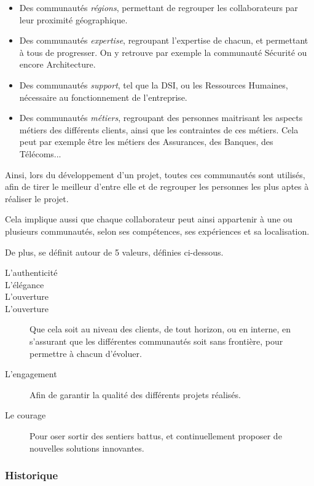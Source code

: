 \begin{itemize}
	\item Des communautés \emph{régions}, permettant de regrouper les collaborateurs par leur proximité géographique.
	\item Des communautés \emph{expertise}, regroupant l'expertise de chacun, et permettant à tous de progresser. On y retrouve par exemple la communauté Sécurité ou encore Architecture.
	\item Des communautés \emph{support}, tel que la \gls{DSI}, ou les Ressources Humaines, nécessaire au fonctionnement de l'entreprise.
	\item Des communautés \emph{métiers}, regroupant des personnes maitrisant les aspects métiers des différents clients, ainsi que les contraintes de ces métiers. Cela peut par exemple être les métiers des Assurances, des Banques, des Télécoms... 
\end{itemize}

Ainsi, lors du développement d'un projet, toutes ces communautés sont utilisés, afin de tirer le meilleur d'entre elle et de regrouper les personnes les plus aptes à réaliser le projet.

Cela implique aussi que chaque collaborateur peut ainsi appartenir à une ou plusieurs communautés, selon ses compétences, ses expériences et sa localisation.

De plus, \onepoint{} se définit autour de 5 valeurs, définies ci-dessous.

\begin{description}
	\item[L'authenticité]
	\item[L'élégance]
	\item[L'ouverture]
	\item[L'ouverture] Que cela soit au niveau des clients, de tout horizon, ou en interne, en s'assurant que les différentes communautés soit sans frontière, pour permettre à chacun d'évoluer.
	\item[L'engagement] Afin de garantir la qualité des différents projets réalisés.
	\item[Le courage] Pour oser sortir des sentiers battus, et continuellement proposer de nouvelles solutions innovantes.
\end{description}

\subsubsection{Historique} 

